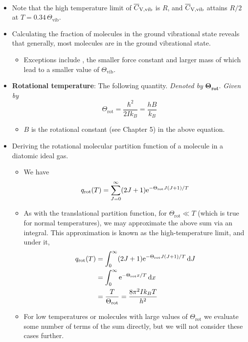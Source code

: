 \documentclass[../notes.tex]{subfiles}
\begin{document}
\begin{itemize}
\begin{gather*}
    \end{gather*}
    \item Note that the high temperature limit of $\overline{C}_\text{V,\text{vib}}$ is $R$, and $\overline{C}_\text{V,\text{vib}}$ attains $R/2$ at $T=0.34\,\Theta_\text{vib}$.
    \item Calculating the fraction of molecules in the ground vibrational state reveals that generally, most molecules are in the ground vibrational state.
    \begin{itemize}
        \item Exceptions include , the smaller force constant and larger mass of which lead to a smaller value of $\Theta_\text{vib}$.
    \end{itemize}
    \item \textbf{Rotational temperature}: The following quantity. \emph{Denoted by} $\bm{\Theta_\text{rot}}$. \emph{Given by}
    \begin{equation*}
        \Theta_\text{rot} = \frac{\hbar^2}{2Ik_B} = \frac{hB}{k_B}
    \end{equation*}
    \begin{itemize}
        \item $B$ is the rotational constant (see Chapter 5) in the above equation.
    \end{itemize}
    \item Deriving the rotational molecular partition function of a molecule in a diatomic ideal gas.
    \begin{itemize}
        \item We have
        \begin{equation*}
            q_\text{rot}(T) = \sum_{J=0}^\infty(2J+1)\e[-\Theta_\text{rot}J(J+1)/T]
        \end{equation*}
        \item As with the translational partition function, for $\Theta_\text{rot}\ll T$ (which is true for normal temperatures), we may approximate the above sum via an integral. This approximation is known as the high-temperature limit, and under it,
        \begin{align*}
            q_\text{rot}(T) &= \int_0^\infty(2J+1)\e[-\Theta_\text{rot}J(J+1)/T]\dd{J}\\
            &= \int_0^\infty\e[-\Theta_\text{rot}x/T]\dd{x}\\
            &= \frac{T}{\Theta_\text{rot}} = \frac{8\pi^2Ik_BT}{h^2}
        \end{align*}
        \item For low temperatures or molecules with large values of $\Theta_\text{rot}$ we evaluate some number of terms of the sum directly, but we will not consider these cases further.

\end{itemize}
\end{itemize}
\end{document}
